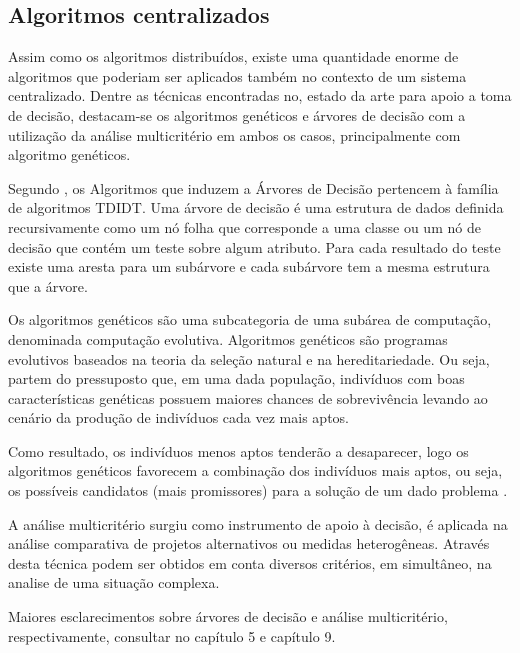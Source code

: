 \subsection{Algoritmos centralizados}
\par
Assim como os algoritmos distribuídos, existe uma quantidade enorme de algoritmos que poderiam ser aplicados também no contexto de um sistema centralizado. Dentre as técnicas encontradas no, estado da arte para apoio a toma de decisão, destacam-se os algoritmos genéticos e árvores de decisão com a utilização da análise multicritério em ambos os casos, principalmente com algoritmo genéticos.
\par
Segundo \cite{REZ05}, os Algoritmos que induzem a Árvores de Decisão pertencem à família de algoritmos TDIDT. Uma árvore de decisão é uma estrutura de dados definida recursivamente como um nó folha que corresponde a uma classe ou um nó de decisão que contém um teste sobre algum atributo. Para cada resultado do teste existe uma aresta para um subárvore e cada subárvore tem a mesma estrutura que a árvore.
\par
Os algoritmos genéticos são uma subcategoria de uma subárea de computação, denominada computação evolutiva. Algoritmos genéticos são programas evolutivos baseados na teoria da seleção natural e na hereditariedade. Ou seja, partem do pressuposto que, em uma dada população, indivíduos com boas características genéticas possuem maiores chances de sobrevivência levando ao cenário da produção de indivíduos cada vez mais aptos. \par
Como resultado, os indivíduos menos aptos tenderão a desaparecer, logo os algoritmos genéticos favorecem a combinação dos indivíduos mais aptos, ou seja, os possíveis candidatos (mais promissores) para a solução de um dado problema \citep{REZ05}.
\par
A análise multicritério surgiu como instrumento de apoio à decisão, é aplicada na análise comparativa de projetos alternativos ou medidas heterogêneas. Através desta técnica podem ser obtidos em conta diversos critérios, em simultâneo, na analise de uma situação complexa.
\par
Maiores esclarecimentos sobre árvores de decisão e análise multicritério, respectivamente, consultar \citep{REZ05} no capítulo 5 e capítulo 9.
